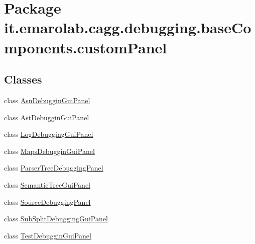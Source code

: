 \hypertarget{namespaceit_1_1emarolab_1_1cagg_1_1debugging_1_1baseComponents_1_1customPanel}{\section{Package it.\-emarolab.\-cagg.\-debugging.\-base\-Components.\-custom\-Panel}
\label{namespaceit_1_1emarolab_1_1cagg_1_1debugging_1_1baseComponents_1_1customPanel}
}
\subsection*{Classes}
\begin{DoxyCompactItemize}
\item 
class \hyperlink{classit_1_1emarolab_1_1cagg_1_1debugging_1_1baseComponents_1_1customPanel_1_1AsnDebugginGuiPanel}{Asn\-Debuggin\-Gui\-Panel}
\item 
class \hyperlink{classit_1_1emarolab_1_1cagg_1_1debugging_1_1baseComponents_1_1customPanel_1_1AstDebugginGuiPanel}{Ast\-Debuggin\-Gui\-Panel}
\item 
class \hyperlink{classit_1_1emarolab_1_1cagg_1_1debugging_1_1baseComponents_1_1customPanel_1_1LogDebuggingGuiPanel}{Log\-Debugging\-Gui\-Panel}
\item 
class \hyperlink{classit_1_1emarolab_1_1cagg_1_1debugging_1_1baseComponents_1_1customPanel_1_1MapsDebugginGuiPanel}{Maps\-Debuggin\-Gui\-Panel}
\item 
class \hyperlink{classit_1_1emarolab_1_1cagg_1_1debugging_1_1baseComponents_1_1customPanel_1_1ParserTreeDebuggingPanel}{Parser\-Tree\-Debugging\-Panel}
\item 
class \hyperlink{classit_1_1emarolab_1_1cagg_1_1debugging_1_1baseComponents_1_1customPanel_1_1SemanticTreeGuiPanel}{Semantic\-Tree\-Gui\-Panel}
\item 
class \hyperlink{classit_1_1emarolab_1_1cagg_1_1debugging_1_1baseComponents_1_1customPanel_1_1SourceDebuggingPanel}{Source\-Debugging\-Panel}
\item 
class \hyperlink{classit_1_1emarolab_1_1cagg_1_1debugging_1_1baseComponents_1_1customPanel_1_1SubSplitDebuggingGuiPanel}{Sub\-Split\-Debugging\-Gui\-Panel}
\item 
class \hyperlink{classit_1_1emarolab_1_1cagg_1_1debugging_1_1baseComponents_1_1customPanel_1_1TestDebugginGuiPanel}{Test\-Debuggin\-Gui\-Panel}
\end{DoxyCompactItemize}
